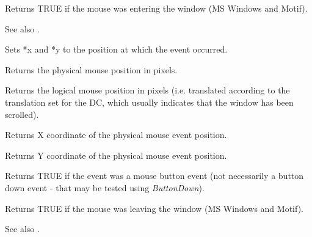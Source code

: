 
Returns TRUE if the mouse was entering the window (MS Windows and Motif).

See also .

\label{wxmouseeventgetposition}



Sets *x and *y to the position at which the event occurred.

Returns the physical mouse position in pixels.

\label{wxmouseeventgetlogicalposition}


Returns the logical mouse position in pixels (i.e. translated according to the
translation set for the DC, which usually indicates that the window has been scrolled).

\label{wxmouseeventgetx}


Returns X coordinate of the physical mouse event position.

\label{wxmouseeventgety}


Returns Y coordinate of the physical mouse event position.



Returns TRUE if the event was a mouse button event (not necessarily a button down event -
that may be tested using {\it ButtonDown}).

\label{wxmouseeventleaving}


Returns TRUE if the mouse was leaving the window (MS Windows and Motif).

See also .



